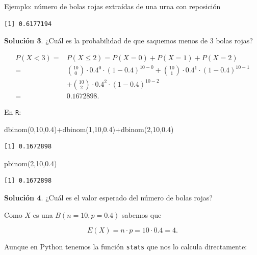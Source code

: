 \documentclass[
  letterpaper,
  DIV=11,
  numbers=noendperiod]{scrreprt}
\newenvironment{Shaded}{\begin{snugshade}}{\end{snugshade}}
\newcommand{\DecValTok}[1]{\textcolor[rgb]{0.68,0.00,0.00}{#1}}
\newcommand{\FloatTok}[1]{\textcolor[rgb]{0.68,0.00,0.00}{#1}}
\newcommand{\FunctionTok}[1]{\textcolor[rgb]{0.28,0.35,0.67}{#1}}
\newcommand{\NormalTok}[1]{\textcolor[rgb]{0.00,0.23,0.31}{#1}}
\newcommand{\SpecialCharTok}[1]{\textcolor[rgb]{0.37,0.37,0.37}{#1}}
\begin{document}
\begin{Ejemplo}{Ejemplo: número de bolas rojas extraídas de una urna con reposición}{}
\begin{verbatim}
[1] 0.6177194
\end{verbatim}

\textbf{Solución 3}. ¿Cuál es la probabilidad de que saquemos menos de
\(3\) bolas rojas?

\begin{align*}
P(X< 3)=& P(X\leq 2)= P(X=0)+P(X=1)+P(X=2)\\
=& 
{10\choose 0}\cdot 0.4^0\cdot (1-0.4)^{10-0}+ {10\choose 1}\cdot 0.4^1\cdot (1-0.4)^{10-1}\\
&+
{10\choose 2}\cdot 0.4^2\cdot (1-0.4)^{10-2}\\
=&0.1672898.
\end{align*}

En \texttt{R}:

\begin{Shaded}
\begin{Highlighting}[]
\FunctionTok{dbinom}\NormalTok{(}\DecValTok{0}\NormalTok{,}\DecValTok{10}\NormalTok{,}\FloatTok{0.4}\NormalTok{)}\SpecialCharTok{+}\FunctionTok{dbinom}\NormalTok{(}\DecValTok{1}\NormalTok{,}\DecValTok{10}\NormalTok{,}\FloatTok{0.4}\NormalTok{)}\SpecialCharTok{+}\FunctionTok{dbinom}\NormalTok{(}\DecValTok{2}\NormalTok{,}\DecValTok{10}\NormalTok{,}\FloatTok{0.4}\NormalTok{)}
\end{Highlighting}
\end{Shaded}

\begin{verbatim}
[1] 0.1672898
\end{verbatim}

\begin{Shaded}
\begin{Highlighting}[]
\FunctionTok{pbinom}\NormalTok{(}\DecValTok{2}\NormalTok{,}\DecValTok{10}\NormalTok{,}\FloatTok{0.4}\NormalTok{)}
\end{Highlighting}
\end{Shaded}

\begin{verbatim}
[1] 0.1672898
\end{verbatim}

\textbf{Solución 4}. ¿Cuál es el valor esperado del número de bolas
rojas?

Como \(X\) es una \(B(n=10,p=0.4)\) sabemos que

\[E(X)=n\cdot p = 10\cdot 0.4=4.\]

Aunque en Python tenemos la función \texttt{stats} que nos lo calcula
directamente:


\end{Ejemplo}
\end{document}
